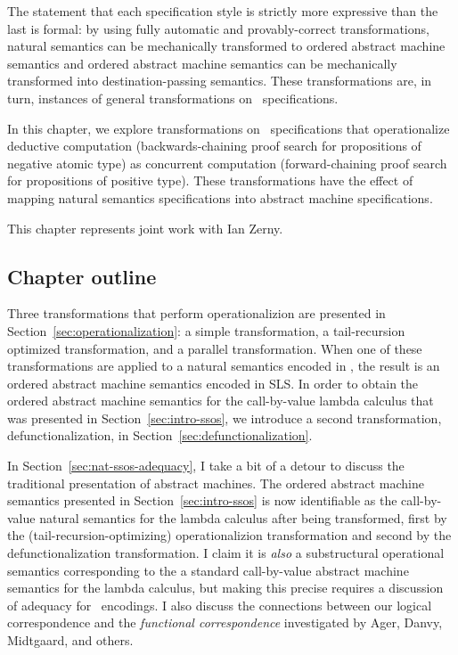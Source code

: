 \noindent
The statement that each specification style is strictly more
expressive than the last is formal: by using fully automatic and
provably-correct transformations, natural semantics can be
mechanically transformed to ordered abstract machine semantics and
ordered abstract machine semantics can be mechanically transformed
into destination-passing semantics. These transformations are, in
turn, instances of general transformations on \sls~specifications.

In this chapter, we explore transformations on \sls~specifications
that operationalize deductive computation (backwards-chaining proof
search for propositions of negative atomic type) as concurrent
computation (forward-chaining proof search for propositions of
positive type). These transformations have the effect of mapping
natural semantics specifications into abstract machine specifications.

This chapter represents joint work with Ian Zerny.

\subsection*{Chapter outline}

Three transformations that perform operationalizion are presented in
Section~\ref{sec:operationalization}: a simple transformation, a
tail-recursion optimized transformation, and a parallel
transformation. When one of these transformations are applied to a
natural semantics encoded in \sls, the result is an ordered abstract
machine semantics encoded in SLS. In order to obtain the ordered
abstract machine semantics for the call-by-value lambda calculus that
was presented in Section~\ref{sec:intro-ssos}, we introduce a second
transformation, defunctionalization, in
Section~\ref{sec:defunctionalization}.

In Section~\ref{sec:nat-ssos-adequacy}, I take a bit of a detour to
discuss the traditional presentation of abstract machines. The ordered
abstract machine semantics presented in Section~\ref{sec:intro-ssos}
is now identifiable as the call-by-value natural semantics for the
lambda calculus after being transformed, first by the
(tail-recursion-optimizing) operationalizion transformation and second
by the defunctionalization transformation. I claim it is {\it also} a
substructural operational semantics corresponding to the a standard
call-by-value abstract machine semantics for the lambda calculus, but
making this precise requires a discussion of adequacy for
\sls~encodings. I also discuss the connections between our logical
correspondence and the {\it functional correspondence} investigated by
Ager, Danvy, Midtgaard, and others.

